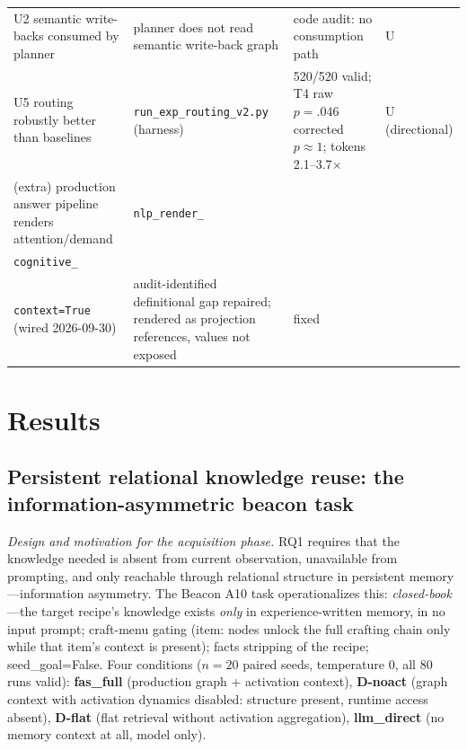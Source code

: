 \documentclass[10pt,a4paper]{article}
\begin{document}
\begin{table}[t]
\begin{tabular}{L{4.6cm}L{3.2cm}L{3.6cm}L{1.7cm}}
U2 semantic write-backs consumed by planner & planner does not read semantic write-back graph & code audit: no consumption path & U \\
U5 routing robustly better than baselines & \texttt{run\_exp\_routing\_v2.py} (harness) & 520/520 valid; T4 raw $p{=}.046$ corrected $p{\approx}1$; tokens 2.1--3.7$\times$ & U (directional) \\
(extra) production answer pipeline renders attention/demand & \texttt{nlp\_render\_}\\ \texttt{cognitive\_}\\ \texttt{context=True} (wired 2026-09-30) & audit-identified definitional gap repaired; rendered as projection references, values not exposed & fixed \\
\bottomrule
\end{tabular}
\end{table}

\section{Results}
\label{sec:results}

\subsection{Persistent relational knowledge reuse: the information-asymmetric beacon task}
\label{sec:res-reuse}
\emph{Design and motivation for the acquisition phase.} RQ1 requires that the knowledge needed is absent from current observation, unavailable from prompting, and only reachable through relational structure in persistent memory---information asymmetry. The Beacon A10 task operationalizes this: \emph{closed-book}---the target recipe's knowledge exists \emph{only} in experience-written memory, in no input prompt; craft-menu gating (item: nodes unlock the full crafting chain only while that item's context is present); facts stripping of the recipe; seed\_goal=False. Four conditions ($n{=}20$ paired seeds, temperature 0, all 80 runs valid): \textbf{fas\_full} (production graph + activation context), \textbf{D-noact} (graph context with activation dynamics disabled: structure present, runtime access absent), \textbf{D-flat} (flat retrieval without activation aggregation), \textbf{llm\_direct} (no memory context at all, model only).
\end{document}
